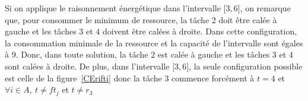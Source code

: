 \documentclass{report}
\newcommand{\inter}[2]{{[}#1,#2{]}}
\begin{document}
Si on applique le raisonnement énergétique dans l'intervalle $\inter{3}{6}$, on remarque que, pour consommer le minimum de ressource, la tâche $2$ doit être calée à gauche et les tâches $3$ et $4$ doivent être calées à droite. Dans cette configuration, la consommation minimale de la ressource et la capacité de l'intervalle sont égales à 9. Donc, dans toute solution, la tâche $2$ est calée à gauche et les tâches $3$ et $4$ sont calées à droite. De plus, dans l'intervalle $\inter{3}{6}$, la seule configuration possible est celle de la figure~\ref{CErifti} donc la tâche $3$ commence forcément à $t=4$ et $\forall i \in A,\ t\neq ft_j$ et $t\neq r_3$
\end{document}

